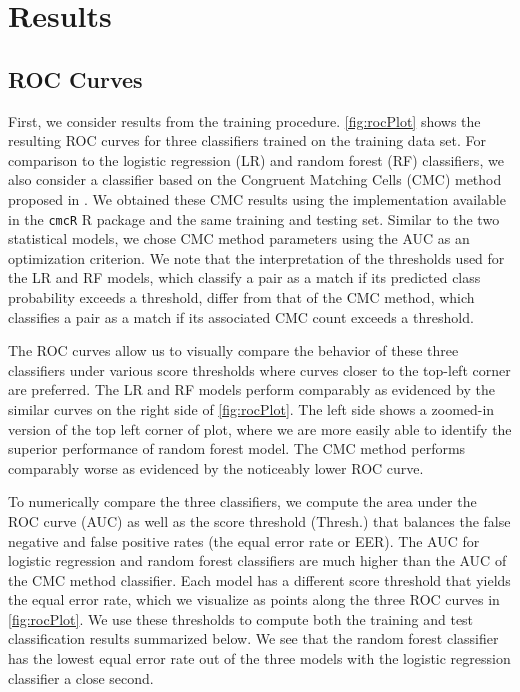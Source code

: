 \documentclass[reprint]{JASA}
\begin{document}
\hypertarget{results}{%
\section{Results}\label{results}}

\hypertarget{roc-curves}{%
\subsection{ROC Curves}\label{roc-curves}}

First, we consider results from the training procedure.
\autoref{fig:rocPlot} shows the resulting ROC curves for three
classifiers trained on the training data set. For comparison to the
logistic regression (LR) and random forest (RF) classifiers, we also
consider a classifier based on the Congruent Matching Cells (CMC) method
proposed in \citet{song_proposed_2013}. We obtained these CMC results
using the implementation available in the \texttt{cmcR} R package
\citep{cmcR} and the same training and testing set. Similar to the two
statistical models, we chose CMC method parameters using the AUC as an
optimization criterion. We note that the interpretation of the
thresholds used for the LR and RF models, which classify a pair as a
match if its predicted class probability exceeds a threshold, differ
from that of the CMC method, which classifies a pair as a match if its
associated CMC count exceeds a threshold.

The ROC curves allow us to visually compare the behavior of these three
classifiers under various score thresholds where curves closer to the
top-left corner are preferred. The LR and RF models perform comparably
as evidenced by the similar curves on the right side of
\autoref{fig:rocPlot}. The left side shows a zoomed-in version of the
top left corner of plot, where we are more easily able to identify the
superior performance of random forest model. The CMC method performs
comparably worse as evidenced by the noticeably lower ROC curve.

To numerically compare the three classifiers, we compute the area under
the ROC curve (AUC) as well as the score threshold (Thresh.) that
balances the false negative and false positive rates (the equal error
rate or EER). The AUC for logistic regression and random forest
classifiers are much higher than the AUC of the CMC method classifier.
Each model has a different score threshold that yields the equal error
rate, which we visualize as points along the three ROC curves in
\autoref{fig:rocPlot}. We use these thresholds to compute both the
training and test classification results summarized below. We see that
the random forest classifier has the lowest equal error rate out of the
three models with the logistic regression classifier a close second.
\end{document}
